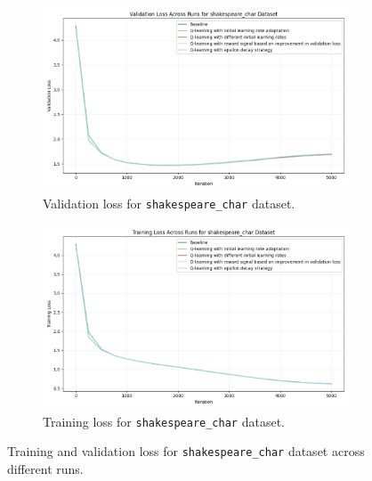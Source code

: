 \documentclass{article} %
\begin{document}
\begin{figure}[h]
    \centering
    \begin{subfigure}{0.49\textwidth}
        \includegraphics[width=\textwidth]{val_loss_shakespeare_char.png}
        \caption{Validation loss for \texttt{shakespeare\_char} dataset.}
        \label{fig:val_loss_shakespeare_char}
    \end{subfigure}
    \hfill
    \begin{subfigure}{0.49\textwidth}
        \includegraphics[width=\textwidth]{train_loss_shakespeare_char.png}
        \caption{Training loss for \texttt{shakespeare\_char} dataset.}
        \label{fig:train_loss_shakespeare_char}
    \end{subfigure}
    \caption{Training and validation loss for \texttt{shakespeare\_char} dataset across different runs.}
    \label{fig:shakespeare_char_loss}
\end{figure}
\end{document}
